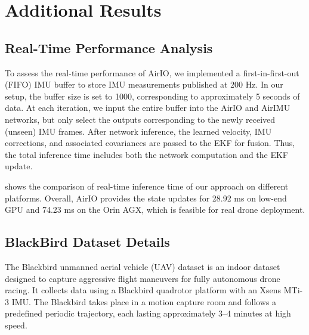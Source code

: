 \section{Additional Results}
\label{sec:airio:additional}

\subsection{Real-Time Performance Analysis}
\label{sec:airio:time}
To assess the real-time performance of AirIO, we implemented a first-in-first-out (FIFO) IMU buffer to store IMU measurements published at 200 Hz. In our setup, the buffer size is set to 1000, corresponding to approximately 5 seconds of data. At each iteration, we input the entire buffer into the AirIO and AirIMU networks, but only select the outputs corresponding to the newly received (unseen) IMU frames. After network inference, the learned velocity, IMU corrections, and associated covariances are passed to the EKF for fusion. Thus, the total inference time includes both the network computation and the EKF update.

 shows the comparison of real-time inference time of our approach on different platforms. Overall, AirIO provides the state updates for 28.92 ms on low-end GPU and 74.23 ms on the Orin AGX, which is feasible for real drone deployment.

\begin{table}[h]
    \caption{Average 1-run inference time (ms) on different platforms for EuRoC.}
    \label{tab:airio:inference_time}
    \centering
\end{table}


\subsection{BlackBird Dataset Details}
\label{sec:airio:blackbird_details}
The Blackbird unmanned aerial vehicle (UAV) dataset is an indoor dataset\cite{antonini2018blackbird} designed to capture aggressive flight maneuvers for fully autonomous drone racing. It collects data using a Blackbird quadrotor platform with an Xsens MTi-3 IMU. The Blackbird takes place in a motion capture room and follows a predefined periodic trajectory, each lasting approximately 3--4 minutes at high speed.

